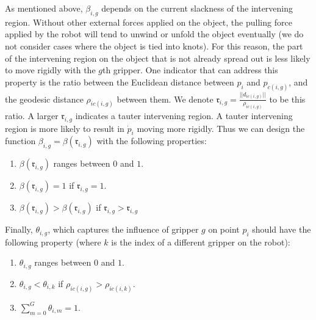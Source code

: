 As mentioned above, $\beta_{i,g}$ depends on the current slackness of the intervening region. 
Without other external forces applied on the object, the pulling force applied by the robot will tend to unwind or unfold the object eventually (we do not consider cases where the object is tied into knots).  
For this reason,  the part of the intervening region on the object that is not already spread out is less likely to move rigidly with the $g$th gripper. 
One indicator that can address this property is the ratio between the Euclidean distance between $p_i$ and $p_{c(i,g)}$, and the geodesic distance $\rho_{ic(i,g)}$ between them. 
We denote $\mathfrak{r}_{i,g} = \frac{||d_{ic(i,g)}||}{\rho_{ic(i,g)}}$ to be this ratio.
A larger $\mathfrak{r}_{i,g}$ indicates a tauter intervening region. 
A tauter intervening region is more likely to result in $\dot{p}_i$ moving more rigidly.
Thus we can design the function $\beta_{i,g} = \beta (\mathfrak{r}_{i,g})$ with the following properties:%
\begin{enumerate}
\item $\beta (\mathfrak{r}_{i,g})$ ranges between $0$ and $1$.
\item $\beta (\mathfrak{r}_{i,g})= 1$ if $\mathfrak{r}_{i,g} = 1$.
\item $\beta (\mathfrak{r}_{i,g}) > \beta (\mathfrak{r}_{i,g})$ if $\mathfrak{r}_{i,g} > \mathfrak{r}_{i,g}$
\end{enumerate}

Finally, $\theta_{i,g}$, which captures the influence of gripper $g$ on point $p_i$ should have the following property (where $k$ is the index of a different gripper on the robot):
\begin{enumerate}
\item $\theta_{i,g}$ ranges between $0$ and $1$.
\item $\theta_{i,g} < \theta_{i,k}$ if $\rho_{ic(i,g)} > \rho_{ic(i,k)}$.
\item $\sum_{m = 0}^{G} \theta_{i,m} = 1$.
\end{enumerate}


